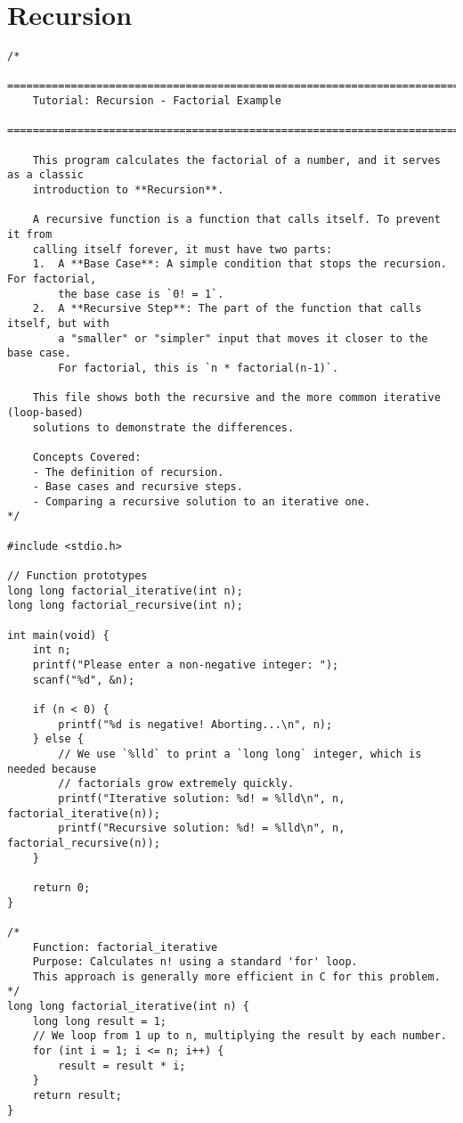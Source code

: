 \documentclass[11pt]{book}
\begin{document}
\chapter{Recursion}
\clearpage
\begin{verbatim}
/*
    ================================================================================
    Tutorial: Recursion - Factorial Example
    ================================================================================

    This program calculates the factorial of a number, and it serves as a classic
    introduction to **Recursion**.

    A recursive function is a function that calls itself. To prevent it from
    calling itself forever, it must have two parts:
    1.  A **Base Case**: A simple condition that stops the recursion. For factorial,
        the base case is `0! = 1`.
    2.  A **Recursive Step**: The part of the function that calls itself, but with
        a "smaller" or "simpler" input that moves it closer to the base case.
        For factorial, this is `n * factorial(n-1)`.

    This file shows both the recursive and the more common iterative (loop-based)
    solutions to demonstrate the differences.

    Concepts Covered:
    - The definition of recursion.
    - Base cases and recursive steps.
    - Comparing a recursive solution to an iterative one.
*/

#include <stdio.h>

// Function prototypes
long long factorial_iterative(int n);
long long factorial_recursive(int n);

int main(void) {
    int n;
    printf("Please enter a non-negative integer: ");
    scanf("%d", &n);

    if (n < 0) {
        printf("%d is negative! Aborting...\n", n);
    } else {
        // We use `%lld` to print a `long long` integer, which is needed because
        // factorials grow extremely quickly.
        printf("Iterative solution: %d! = %lld\n", n, factorial_iterative(n));
        printf("Recursive solution: %d! = %lld\n", n, factorial_recursive(n));
    }

    return 0;
}

/*
    Function: factorial_iterative
    Purpose: Calculates n! using a standard 'for' loop.
    This approach is generally more efficient in C for this problem.
*/
long long factorial_iterative(int n) {
    long long result = 1;
    // We loop from 1 up to n, multiplying the result by each number.
    for (int i = 1; i <= n; i++) {
        result = result * i;
    }
    return result;
}


\end{verbatim}
\end{document}
